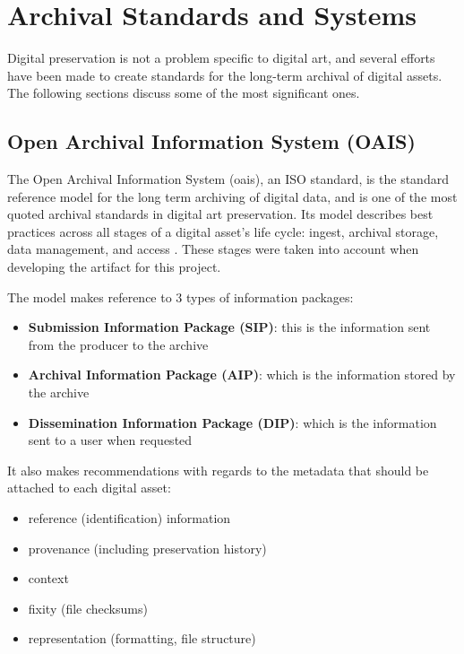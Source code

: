 \section{Archival Standards and Systems}

Digital preservation is not a problem specific to digital art, and several efforts have been made to create standards for the long-term archival of digital assets. The following sections discuss some of the most significant ones.

\subsection{Open Archival Information System (OAIS)}
\label{sub:oais}

The Open Archival Information System (\gls{oais}), an ISO standard, is the standard reference model for the long term archiving of digital data, and is one of the most quoted archival standards in digital art preservation. Its model describes best practices across all stages of a digital asset's life cycle: ingest, archival storage, data management, and access \cite{ccsdsReferenceModelOpen2012}. These stages were taken into account when developing the artifact for this project.

The model makes reference to 3 types of information packages:

\begin{itemize}
    \item \textbf{Submission Information Package (SIP)}: this is the information sent from the producer to the archive 
    \item \textbf{Archival Information Package (AIP)}: which is the information stored by the archive
    \item \textbf{Dissemination Information Package (DIP)}: which is the information sent to a user when requested
\end{itemize}

It also makes recommendations with regards to the metadata that should be attached to each digital asset:

\begin{itemize}
    \item reference (identification) information
    \item provenance (including preservation history)
    \item context
    \item fixity (file checksums)
    \item representation (formatting, file structure)
\end{itemize}


